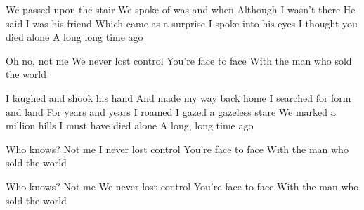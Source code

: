
We passed upon the stair
We spoke of was and when
Although I wasn't there
He said I was his friend
Which came as a surprise
I spoke into his eyes
I thought you died alone
A long long time ago

Oh no, not me
We never lost control
You're face to face
With the man who sold the world

I laughed and shook his hand
And made my way back home
I searched for form and land
For years and years I roamed
I gazed a gazeless stare
We marked a million hills
I must have died alone
A long, long time ago

Who knows?
Not me
I never lost control
You're face to face
With the man who sold the world

Who knows?
Not me
We never lost control
You're face to face
With the man who sold the world 